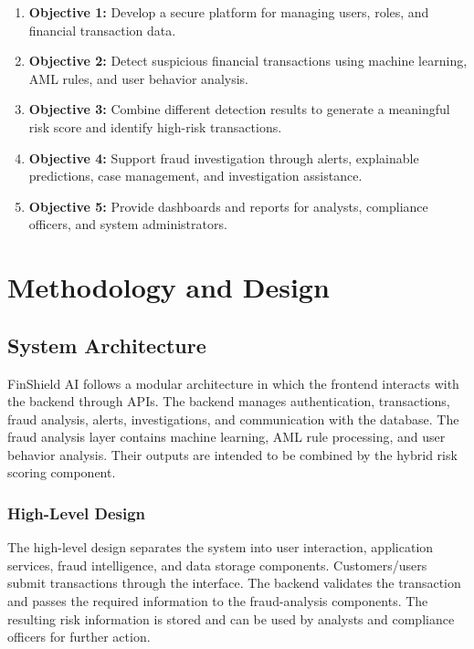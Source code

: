 \documentclass{tietreport}
\begin{document}
\begin{enumerate}
  \item \textbf{Objective 1:} Develop a secure platform for managing users,
    roles, and financial transaction data.
  \item \textbf{Objective 2:} Detect suspicious financial transactions using
    machine learning, AML rules, and user behavior analysis.
  \item \textbf{Objective 3:} Combine different detection results to generate
    a meaningful risk score and identify high-risk transactions.
  \item \textbf{Objective 4:} Support fraud investigation through alerts,
    explainable predictions, case management, and investigation assistance.
  \item \textbf{Objective 5:} Provide dashboards and reports for analysts,
    compliance officers, and system administrators.
\end{enumerate}


\chapter{Methodology and Design}

\section{System Architecture}

FinShield AI follows a modular architecture in which the frontend interacts
with the backend through APIs. The backend manages authentication,
transactions, fraud analysis, alerts, investigations, and communication with
the database. The fraud analysis layer contains machine learning, AML rule
processing, and user behavior analysis. Their outputs are intended to be
combined by the hybrid risk scoring component.

\subsection{High-Level Design}

The high-level design separates the system into user interaction,
application services, fraud intelligence, and data storage components.
Customers/users submit transactions through the interface. The backend
validates the transaction and passes the required information to the
fraud-analysis components. The resulting risk information is stored and can
be used by analysts and compliance officers for further action.
\end{document}
